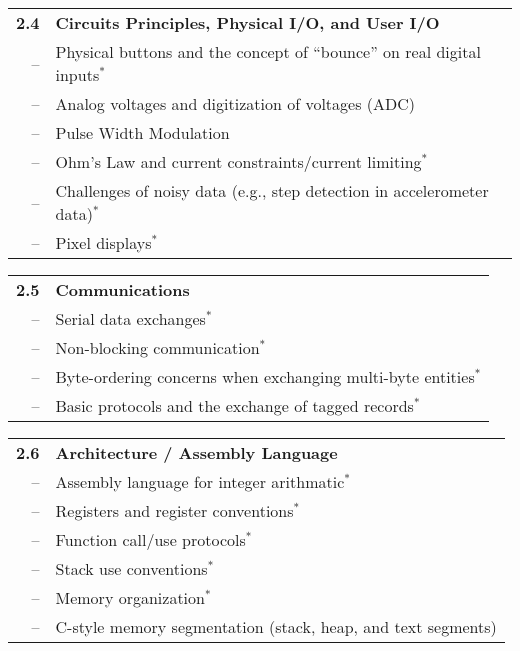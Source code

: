 \vspace{0.1in}
\noindent
\begin{tabular}{r l}
{\bf 2.4} & {\bf Circuits Principles, Physical I/O, and User I/O} \\
-- & Physical buttons and the concept of ``bounce'' on real digital inputs$^*$ \\
-- & Analog voltages and digitization of voltages (ADC) \\
-- & Pulse Width Modulation \\
-- & Ohm's Law and current constraints/current limiting$^*$ \\
-- & Challenges of noisy data (e.g., step detection in accelerometer data)$^*$ \\
-- & Pixel displays$^*$
\end{tabular}

\vspace{0.1in}
\noindent
\begin{tabular}{r l}
{\bf 2.5} & {\bf Communications} \\
-- & Serial data exchanges$^*$ \\
-- & Non-blocking communication$^*$ \\
-- & Byte-ordering concerns when exchanging multi-byte entities$^*$ \\
-- & Basic protocols and the exchange of tagged records$^*$
\end{tabular}

\vspace{0.1in}
\noindent
\begin{tabular}{r l}
{\bf 2.6} & {\bf Architecture / Assembly Language} \\
-- & Assembly language for integer arithmatic$^*$ \\
-- & Registers and register conventions$^*$ \\
-- & Function call/use protocols$^*$ \\
-- & Stack use conventions$^*$ \\
-- & Memory organization$^*$ \\
-- & C-style memory segmentation (stack, heap, and text segments)
\end{tabular}
